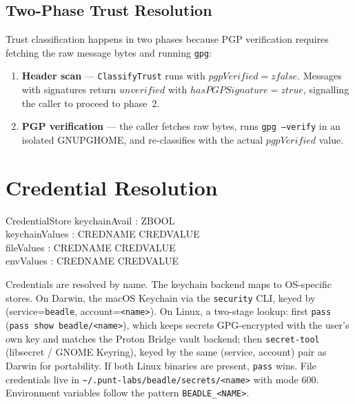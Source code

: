 \documentclass[a4paper,10pt,fleqn]{article}
\begin{document}
\subsection{Two-Phase Trust Resolution}

Trust classification happens in two phases because PGP verification
requires fetching the raw message bytes and running \texttt{gpg}:

\begin{enumerate}
  \item \textbf{Header scan} --- \texttt{ClassifyTrust} runs with
    $pgpVerified = zfalse$.  Messages with signatures return
    $unverified$ with $hasPGPSignature = ztrue$, signalling the
    caller to proceed to phase~2.
  \item \textbf{PGP verification} --- the caller fetches raw bytes,
    runs \texttt{gpg --verify} in an isolated GNUPGHOME, and
    re-classifies with the actual $pgpVerified$ value.
\end{enumerate}

\section{Credential Resolution}

\begin{schema}{CredentialStore}
  keychainAvail : ZBOOL \\
  keychainValues : CREDNAME \pfun CREDVALUE \\
  fileValues : CREDNAME \pfun CREDVALUE \\
  envValues : CREDNAME \pfun CREDVALUE
\end{schema}

Credentials are resolved by name.  The keychain backend maps to
OS-specific stores.  On Darwin, the macOS Keychain via the
\texttt{security} CLI, keyed by (service=\texttt{beadle},
account=\texttt{<name>}).  On Linux, a two-stage lookup: first
\texttt{pass} (\texttt{pass show beadle/<name>}), which keeps
secrets GPG-encrypted with the user's own key and matches the
Proton Bridge vault backend; then \texttt{secret-tool} (libsecret
/ GNOME Keyring), keyed by the same (service, account) pair as
Darwin for portability.  If both Linux binaries are present,
\texttt{pass} wins.  File credentials live in
\texttt{\~{}/.punt-labs/beadle/secrets/<name>} with mode 600.
Environment variables follow the pattern \texttt{BEADLE\_<NAME>}.
\end{document}
